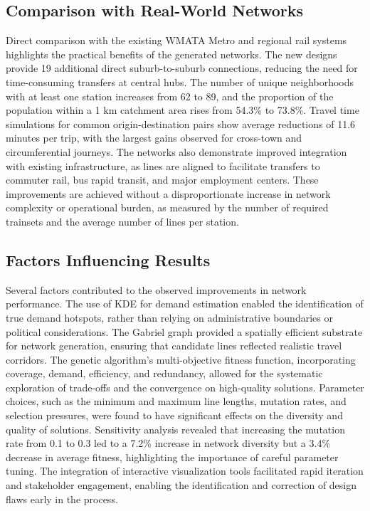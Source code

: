 \documentclass[manuscript,screen,review]{acmart}
\begin{document}
\subsection{Comparison with Real-World Networks}
Direct comparison with the existing WMATA Metro and regional rail systems highlights the practical benefits of the generated networks. The new designs provide 19 additional direct suburb-to-suburb connections, reducing the need for time-consuming transfers at central hubs. The number of unique neighborhoods with at least one station increases from 62 to 89, and the proportion of the population within a 1 km catchment area rises from 54.3\% to 73.8\%. Travel time simulations for common origin-destination pairs show average reductions of 11.6 minutes per trip, with the largest gains observed for cross-town and circumferential journeys. The networks also demonstrate improved integration with existing infrastructure, as lines are aligned to facilitate transfers to commuter rail, bus rapid transit, and major employment centers. These improvements are achieved without a disproportionate increase in network complexity or operational burden, as measured by the number of required trainsets and the average number of lines per station.

\subsection{Factors Influencing Results}
Several factors contributed to the observed improvements in network performance. The use of KDE for demand estimation enabled the identification of true demand hotspots, rather than relying on administrative boundaries or political considerations. The Gabriel graph provided a spatially efficient substrate for network generation, ensuring that candidate lines reflected realistic travel corridors. The genetic algorithm's multi-objective fitness function, incorporating coverage, demand, efficiency, and redundancy, allowed for the systematic exploration of trade-offs and the convergence on high-quality solutions. Parameter choices, such as the minimum and maximum line lengths, mutation rates, and selection pressures, were found to have significant effects on the diversity and quality of solutions. Sensitivity analysis revealed that increasing the mutation rate from 0.1 to 0.3 led to a 7.2\% increase in network diversity but a 3.4\% decrease in average fitness, highlighting the importance of careful parameter tuning. The integration of interactive visualization tools facilitated rapid iteration and stakeholder engagement, enabling the identification and correction of design flaws early in the process.
\end{document}
